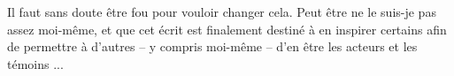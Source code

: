 \documentclass{article}
\begin{document}
% 

Il faut sans doute être fou pour vouloir changer cela. Peut être ne le suis-je pas assez moi-même, et que cet écrit est finalement destiné à en inspirer certains afin de permettre à d'autres -- y compris moi-même -- d'en être les acteurs et les témoins ...

 
\end{document}
